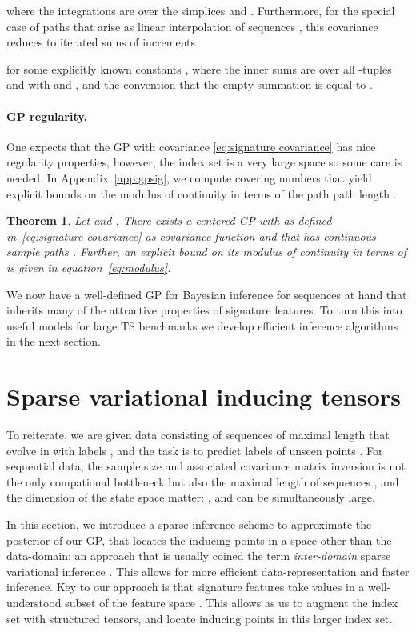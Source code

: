 \documentclass{article}
\newtheorem{theorem}{Theorem}
\begin{document}
where the integrations are over the simplices  and . Furthermore, for the special case of paths that arise as linear interpolation of sequences , this covariance reduces to iterated sums of increments

for some explicitly known constants , where the inner sums are over all -tuples  and  with  and , and the convention that the empty summation is equal to .


\paragraph{GP regularity.}
One expects that the GP with covariance \eqref{eq:signature covariance} has nice regularity properties, however, the index set  is a very large space so some care is needed. 
In Appendix~\ref{app:gpsig}, we compute covering numbers that yield explicit bounds on the modulus of continuity in terms of the path path length . 
\begin{theorem} \label{thm:continuity}
  Let  and .
  There exists a centered GP  with  as defined in~\eqref{eq:signature covariance} as covariance function and that has continuous sample paths .
  Further, an explicit bound on its modulus of continuity in terms of  is given in equation~\eqref{eq:modulus}. 
\end{theorem}
We now have a well-defined GP for Bayesian inference for sequences at hand that inherits many of the attractive properties of signature features. 
To turn this into useful models for large TS benchmarks we develop efficient inference algorithms in the next section.

\section{Sparse variational inducing tensors}\label{sec:sparse var tensor}
To reiterate, we are given data  consisting of  sequences  of maximal length  that evolve in  with labels , and the task is to predict labels  of unseen points .
For sequential data, the sample size  and associated covariance matrix inversion is not the only compational bottleneck but also the maximal length of sequences , and the dimension  of the state space matter: ,  and  can be simultaneously large. 

In this section, we introduce a sparse inference scheme to approximate the posterior of our GP, that locates the inducing points in a space other than the data-domain; an approach that is usually coined the term \textit{inter-domain} sparse variational inference \cite{lazaro2009inter, matthews2016sparse}. This allows for more efficient data-representation and faster inference. 
Key to our approach is that signature features take values in a well-understood subset of the feature space .
This allows as us to augment the index set with structured tensors, and locate inducing points in this larger index set.
\end{document}
